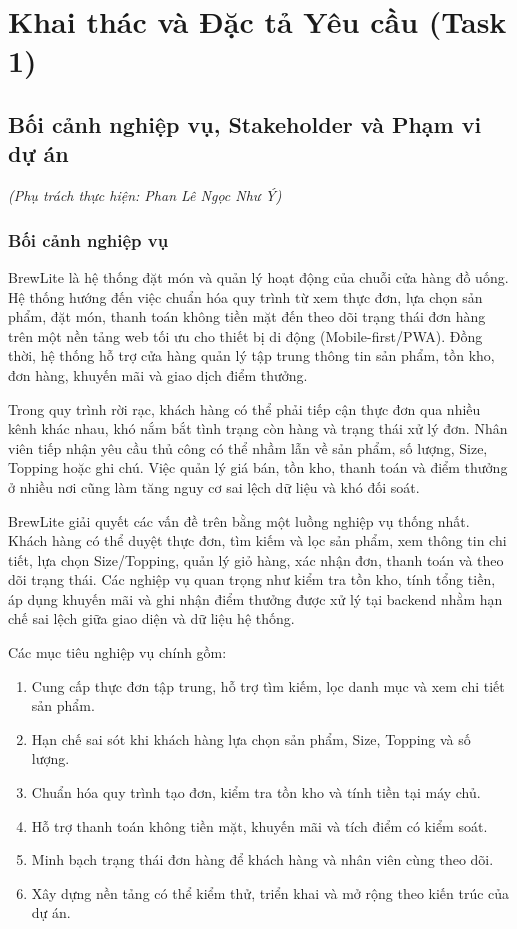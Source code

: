 \section{Khai thác và Đặc tả Yêu cầu (Task 1)}

\subsection{Bối cảnh nghiệp vụ, Stakeholder và Phạm vi dự án}
\textit{(Phụ trách thực hiện: Phan Lê Ngọc Như Ý)}

\subsubsection{Bối cảnh nghiệp vụ}
BrewLite là hệ thống đặt món và quản lý hoạt động của chuỗi cửa hàng đồ uống. Hệ thống hướng đến việc chuẩn hóa quy trình từ xem thực đơn, lựa chọn sản phẩm, đặt món, thanh toán không tiền mặt đến theo dõi trạng thái đơn hàng trên một nền tảng web tối ưu cho thiết bị di động (Mobile-first/PWA). Đồng thời, hệ thống hỗ trợ cửa hàng quản lý tập trung thông tin sản phẩm, tồn kho, đơn hàng, khuyến mãi và giao dịch điểm thưởng.

Trong quy trình rời rạc, khách hàng có thể phải tiếp cận thực đơn qua nhiều kênh khác nhau, khó nắm bắt tình trạng còn hàng và trạng thái xử lý đơn. Nhân viên tiếp nhận yêu cầu thủ công có thể nhầm lẫn về sản phẩm, số lượng, Size, Topping hoặc ghi chú. Việc quản lý giá bán, tồn kho, thanh toán và điểm thưởng ở nhiều nơi cũng làm tăng nguy cơ sai lệch dữ liệu và khó đối soát.

BrewLite giải quyết các vấn đề trên bằng một luồng nghiệp vụ thống nhất. Khách hàng có thể duyệt thực đơn, tìm kiếm và lọc sản phẩm, xem thông tin chi tiết, lựa chọn Size/Topping, quản lý giỏ hàng, xác nhận đơn, thanh toán và theo dõi trạng thái. Các nghiệp vụ quan trọng như kiểm tra tồn kho, tính tổng tiền, áp dụng khuyến mãi và ghi nhận điểm thưởng được xử lý tại backend nhằm hạn chế sai lệch giữa giao diện và dữ liệu hệ thống.

Các mục tiêu nghiệp vụ chính gồm:
\begin{enumerate}
    \item Cung cấp thực đơn tập trung, hỗ trợ tìm kiếm, lọc danh mục và xem chi tiết sản phẩm.
    \item Hạn chế sai sót khi khách hàng lựa chọn sản phẩm, Size, Topping và số lượng.
    \item Chuẩn hóa quy trình tạo đơn, kiểm tra tồn kho và tính tiền tại máy chủ.
    \item Hỗ trợ thanh toán không tiền mặt, khuyến mãi và tích điểm có kiểm soát.
    \item Minh bạch trạng thái đơn hàng để khách hàng và nhân viên cùng theo dõi.
    \item Xây dựng nền tảng có thể kiểm thử, triển khai và mở rộng theo kiến trúc của dự án.
\end{enumerate}

